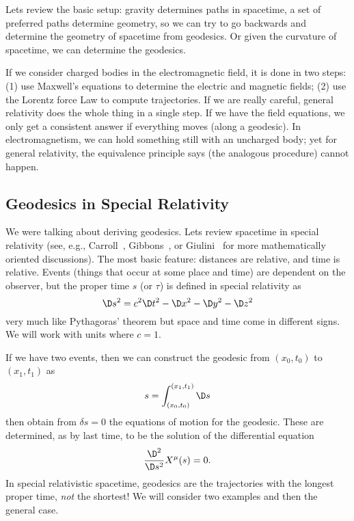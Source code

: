 Lets review the basic setup: gravity determines paths in
spacetime, a set of preferred paths determine geometry, so we
can try to go backwards and determine the geometry of spacetime
from geodesics. Or given the curvature of spacetime, we can
determine the geodesics. 


If we consider charged bodies in the electromagnetic field, it is
done in two steps: (1) use Maxwell's equations to determine the
electric and magnetic fields; (2) use the Lorentz force Law to
compute trajectories. If we are really careful, general
relativity does the whole thing in a single step. If we have the
field equations, we only get a consistent answer if everything
moves (along a geodesic). In electromagnetism, we can hold
something still with an uncharged body; yet for general
relativity, the equivalence principle says (the analogous
procedure) cannot happen.

\subsection{Geodesics in Special Relativity}

We were talking about deriving geodesics. Lets review spacetime
in special relativity (see, e.g.,
Carroll~\cite[\normalfont\S\S1.1--1.4]{Carroll:2004st}, Gibbons~\cite{gibbons:2010}, or
Giulini~\cite{Giulini:2006uy,Giulini:2008pu} for more
mathematically oriented discussions). The most basic feature:
distances are relative, and time is relative. Events (things that
occur at some place and time) are dependent on the observer, but
the proper time $s$ (or $\tau$) is defined in special relativity
as
\begin{equation}
\D s^2=c^2\D t^2-\D x^2-\D y^2-\D z^2
\end{equation}
very much like Pythagoras' theorem but space and time come in
different signs. We will work with units
where $c=1$.

If we have two events, then we can construct the geodesic from
$(x_0,t_0)$ to $(x_1,t_1)$ as 
\begin{equation}
s=\int^{(x_1,t_1)}_{(x_0,t_0)}\D s
\end{equation}
then obtain from $\delta s=0$ the equations of motion for the
geodesic. These are determined, as by last time, to be the
solution of the differential equation
\begin{equation}
\frac{\D^2}{\D s^2}X^{\mu}(s)=0.
\end{equation}
In special relativistic spacetime, geodesics are the trajectories
with the longest proper time, \emph{not} the shortest! We will
consider two examples and then the general case.

